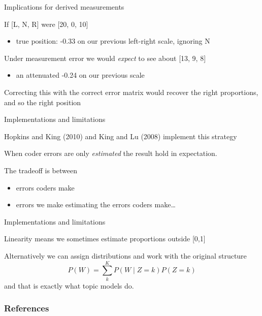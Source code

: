 \documentclass{hertieteaching}
\begin{document}
\begin{frame}{Implications for derived measurements}
\protect\hypertarget{implications-for-derived-measurements}{}

If {[}L, N, R{]} were {[}20, 0, 10{]}

\begin{itemize}
\tightlist
\item
  true position: -0.33 on our previous left-right scale, ignoring N
\end{itemize}

Under measurement error we would \emph{expect} to see about {[}13, 9,
8{]}

\begin{itemize}
\tightlist
\item
  an attenuated -0.24 on our previous scale
\end{itemize}

Correcting this with the correct error matrix would recover the right
proportions, and so the right position

\end{frame}

\begin{frame}{Implementations and limitations}
\protect\hypertarget{implementations-and-limitations}{}

Hopkins and King (2010) and King and Lu (2008) implement this strategy

\pause

When coder errors are only \emph{estimated} the result hold in
expectation.

The tradeoff is between

\begin{itemize}
\tightlist
\item
  errors coders make
\item
  errors we make estimating the errors coders make\ldots{}
\end{itemize}

\end{frame}

\begin{frame}{Implementations and limitations}
\protect\hypertarget{implementations-and-limitations-1}{}

Linearity means we sometimes estimate proportions outside {[}0,1{]}

Alternatively we can assign distributions and work with the original
structure \[
{P(W)} = \sum^K_k {P(W \mid Z=k)} P(Z=k)
\] and that is exactly what topic models do.

\end{frame}


\begin{frame}[allowframebreaks]
\frametitle{References}
\printbibliography	
\end{frame}
\end{document}
